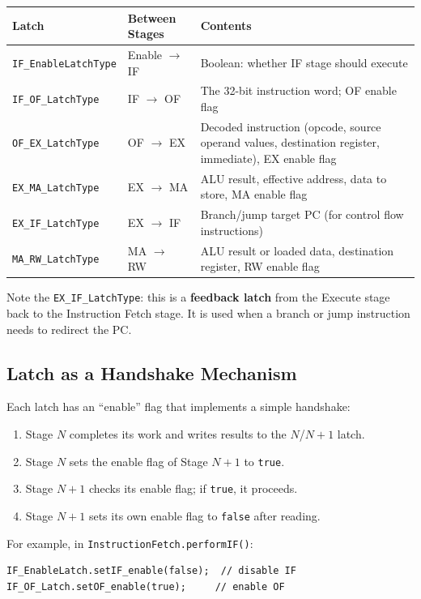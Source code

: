 \documentclass[12pt,a4paper]{article}
\begin{document}
\begin{longtable}{p{4cm}p{3cm}p{6cm}}
\toprule
\textbf{Latch} & \textbf{Between Stages} & \textbf{Contents} \\
\midrule
\texttt{IF\_EnableLatchType} & Enable $\to$ IF & Boolean: whether IF stage should execute \\
\texttt{IF\_OF\_LatchType} & IF $\to$ OF & The 32-bit instruction word; OF enable flag \\
\texttt{OF\_EX\_LatchType} & OF $\to$ EX & Decoded instruction (opcode, source operand values, destination register, immediate), EX enable flag \\
\texttt{EX\_MA\_LatchType} & EX $\to$ MA & ALU result, effective address, data to store, MA enable flag \\
\texttt{EX\_IF\_LatchType} & EX $\to$ IF & Branch/jump target PC (for control flow instructions) \\
\texttt{MA\_RW\_LatchType} & MA $\to$ RW & ALU result or loaded data, destination register, RW enable flag \\
\bottomrule
\end{longtable}

Note the \texttt{EX\_IF\_LatchType}: this is a \textbf{feedback latch} from the Execute stage back to the Instruction Fetch stage. It is used when a branch or jump instruction needs to redirect the PC.

\subsection{Latch as a Handshake Mechanism}

Each latch has an ``enable'' flag that implements a simple handshake:
\begin{enumerate}
    \item Stage $N$ completes its work and writes results to the $N$/$N{+}1$ latch.
    \item Stage $N$ sets the enable flag of Stage $N{+}1$ to \texttt{true}.
    \item Stage $N{+}1$ checks its enable flag; if \texttt{true}, it proceeds.
    \item Stage $N{+}1$ sets its own enable flag to \texttt{false} after reading.
\end{enumerate}

For example, in \texttt{InstructionFetch.performIF()}:
\begin{lstlisting}[style=javastyle]
IF_EnableLatch.setIF_enable(false);  // disable IF
IF_OF_Latch.setOF_enable(true);     // enable OF
\end{lstlisting}
\end{document}
